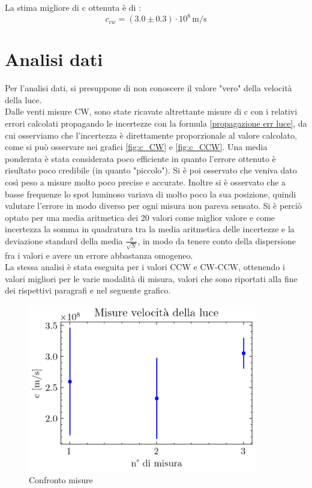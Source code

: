 \documentclass{article}
\begin{document}
            La stima migliore di c ottenuta è di : \[c_{cw} = (3.0	\pm 0.3) \cdot 10^8 \, \mathrm{m/s}\] 
        
        \newpage


    \section{Analisi dati}
    
        Per l'analisi dati, si presuppone di non conoscere il valore "vero" della velocità della luce. \\
        Dalle venti misure CW, sono state ricavate altrettante misure di c con i relativi errori calcolati propagando le incertezze 
        con la formula \ref{propagazione err luce}, da cui osserviamo che l'incertezza è direttamente proporzionale al valore calcolato, 
        come si può osservare nei grafici \ref{fig:c_CW} e \ref{fig:c_CCW}. 
        Una media ponderata è stata considerata poco efficiente in quanto l'errore ottenuto è risultato poco credibile (in quanto "piccolo"). 
        Si è poi osservato che veniva dato così peso a misure molto poco precise e accurate. Inoltre si è osservato che a basse frequenze 
        lo spot luminoso variava di molto poco la sua posizione, quindi valutare l'errore in modo diverso per ogni misura non pareva sensato.
        Si è perciò optato per una media aritmetica dei 20 valori come miglior valore e come incertezza la somma in quadratura tra 
        la media aritmetica delle incertezze e la deviazione standard della media $\frac{\sigma}{\sqrt{N}}$, 
        in modo da tenere conto della dispersione fra i valori e avere un errore abbastanza omogeneo. \\

        La stessa analisi è stata eseguita per i valori CCW e CW-CCW, ottenendo i valori migliori per le varie modalità di misura, 
        valori che sono riportati alla fine dei rispettivi paragrafi e nel seguente grafico. 
        
        \begin{figure}[H]

            \centering
            \includegraphics[width=10cm]{../images/results.png}
            \caption{Confronto misure}

        \end{figure}
\end{document}
